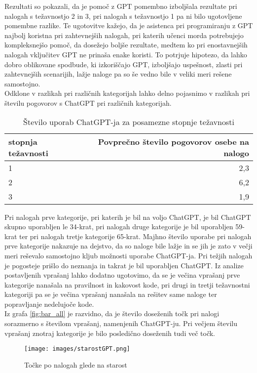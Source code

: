 \documentclass[a4paper,12pt,openright]{book}
\begin{document}
Rezultati so pokazali, da je pomoč z GPT pomembno izboljšala rezultate pri nalogah s težavnostjo 2 in 3, pri nalogah s težavnostjo 1 pa ni bilo ugotovljene pomembne razlike. Te ugotovitve kažejo, da je asistenca pri programiranju z GPT najbolj koristna pri zahtevnejših nalogah, pri katerih učenci morda potrebujejo kompleksnejšo pomoč, da dosežejo boljše rezultate, medtem ko pri enostavnejših nalogah vključitev GPT ne prinaša enake koristi. To potrjuje hipotezo, da lahko dobro oblikovane spodbude, ki izkoriščajo GPT, izboljšajo uspešnost, zlasti pri zahtevnejših scenarijih, lažje naloge pa so še vedno bile v veliki meri rešene samostojno.\\
Odklone v razlikah pri različnih kategorijah lahko delno pojasnimo v razlikah pri številu pogovorov s ChatGPT pri različnih kategorijah.

\begin{table}[h!]
\centering
\begin{tabular}{|l|r|}
\hline
\textbf{stopnja težavnosti} & \textbf{Povprečno število pogovorov osebe na nalogo} \\
\hline
1 & 2,3 \\
\hline
2 & 6,2 \\
\hline
3 & 1,9 \\
\hline
\end{tabular}
\caption{Število uporab ChatGPT-ja za posamezne stopnje težavnosti}
\label{tab:st-pogovorov}
\end{table}
Pri nalogah prve kategorije, pri katerih je bil na voljo ChatGPT, je bil ChatGPT skupno uporabljen le 34-krat, pri nalogah druge kategorije je bil uporabljen 59-krat ter pri nalogah tretje kategorije 65-krat. Majhno število uporabe pri nalogah prve kategorije nakazuje na dejstvo, da so naloge bile lažje in se jih je zato v večji meri reševalo samostojno kljub možnosti uporabe ChatGPT-ja. Pri težjih nalogah je pogosteje prišlo do neznanja in takrat je bil uporabljen ChatGPT. Iz analize postavljenih vprašanj lahko dodatno ugotovimo, da se je večina vprašanj prve kategorije nanašala na pravilnost in kakovost kode, pri drugi in tretji težavnostni kategoriji pa se je večina vprašanj nanašala na rešitev same naloge ter popravljanje nedelujoče kode.\\
Iz grafa \ref{fig:bar_all} je razvidno, da je število doseženih točk pri nalogi sorazmerno s številom vprašanj, namenjenih ChatGPT-ju. Pri večjem številu vprašanj znotraj kategorije je bilo posledično doseženih tudi več točk. 

\pagebreak
\begin{figure}[H]
    \centering
    \texttt{[image: images/starostGPT.png]}
    \caption{Točke po nalogah glede na starost}
    \label{fig:starostGPT}
\end{figure}
\end{document}
